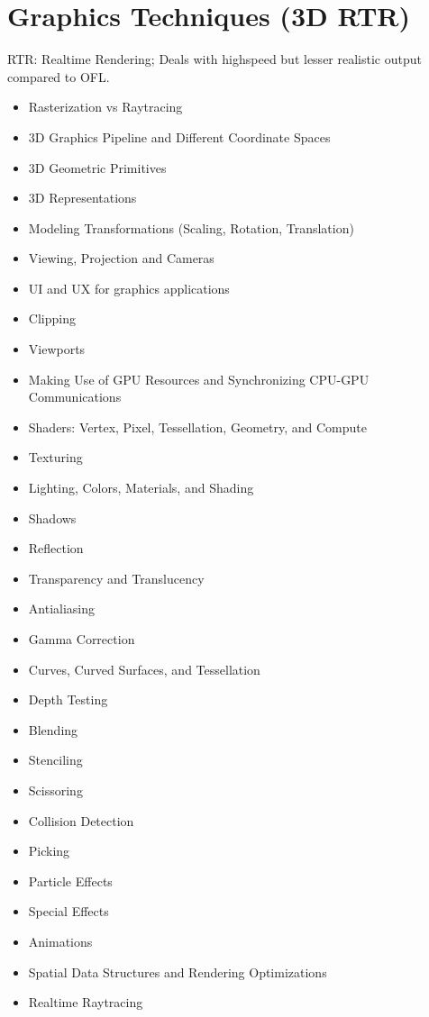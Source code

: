 \section{Graphics Techniques (3D RTR)}
RTR: Realtime Rendering; Deals with highspeed but lesser realistic output compared to OFL.
\begin{itemize}
    \item Rasterization vs Raytracing
    \item 3D Graphics Pipeline and Different Coordinate Spaces
    \item 3D Geometric Primitives
    \item 3D Representations
    \item Modeling Transformations (Scaling, Rotation, Translation)
    \item Viewing, Projection and Cameras
    \item UI and UX for graphics applications
    \item Clipping
    \item Viewports
    \item Making Use of GPU Resources and Synchronizing CPU-GPU Communications
    \item Shaders: Vertex, Pixel, Tessellation, Geometry, and Compute
    \item Texturing
    \item Lighting, Colors, Materials, and Shading
    \item Shadows
    \item Reflection
    \item Transparency and Translucency
    \item Antialiasing
    \item Gamma Correction
    \item Curves, Curved Surfaces, and Tessellation
    \item Depth Testing
    \item Blending
    \item Stenciling
    \item Scissoring
    \item Collision Detection
    \item Picking
    \item Particle Effects
    \item Special Effects
    \item Animations
    \item Spatial Data Structures and Rendering Optimizations
    \item Realtime Raytracing
\end{itemize}

